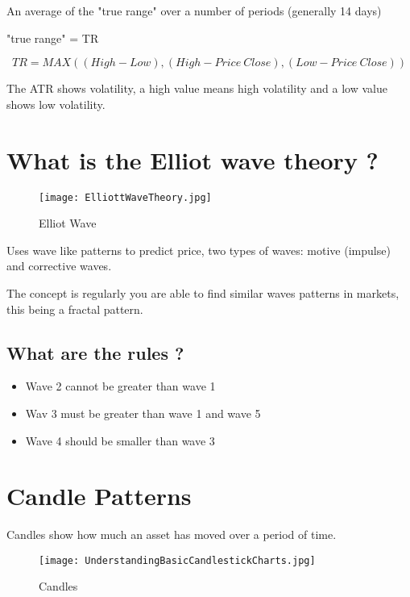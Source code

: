 \documentclass[11pt]{scrartcl} %
\begin{document}
An average of the "true range" over a number of periods (generally 14 days)

"true range" = TR

\[ TR = MAX((High-Low),(High - Price\:Close),(Low-Price\:Close)) \]

The ATR shows volatility, a high value means high volatility and a low value shows low volatility.

\section{What is the Elliot wave theory ?}

\begin{figure}[t] %
	\centering
	\texttt{[image: ElliottWaveTheory.jpg]} %
	\caption{Elliot Wave}
\end{figure}

Uses wave like patterns to predict price, two types of waves: motive (impulse) and corrective waves.

The concept is regularly you are able to find similar waves patterns in markets, this being
a fractal pattern.

\subsection{What are the rules ?}

\begin{itemize}
	\item Wave 2 cannot be greater than wave 1
	\item Wav 3 must be greater than wave 1 and wave 5
	\item Wave 4 should be smaller than wave 3
\end{itemize}

\section{Candle Patterns}

Candles show how much an asset has moved over a period of time. 

\begin{figure}[t] %
	\centering
	\texttt{[image: UnderstandingBasicCandlestickCharts.jpg]} %
	\caption{Candles}
\end{figure}
\end{document}
